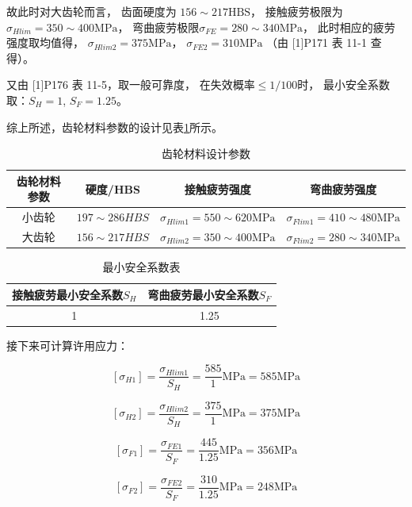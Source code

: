 \documentclass[12pt]{ctexart}
\begin{document}
故此时对大齿轮而言，
齿面硬度为 $156\sim 217\text{HBS}$，
接触疲劳极限为$\sigma_{Hlim}=350\sim 400\text{MPa}$，
弯曲疲劳极限$\sigma_{FE}=280\sim 340\text{MPa}$，
此时相应的疲劳强度取均值得，
$\sigma_{Hlim2} = 375\text{MPa}$，
$\sigma_{FE2}= 310\text{MPa}$
（由 [1]P171 表 11-1 查得）。

又由 [1]P176 表 11-5，取一般可靠度，
在失效概率$\le 1/100$时，
最小安全系数取：$S_H=1$, $S_F=1.25$。

综上所述，齿轮材料参数的设计见表\ref{label_1}所示。

\begin{table}[htbp]
    \centering
    \setlength{\belowcaptionskip}{0.3cm}
    \caption{齿轮材料设计参数}
    \begin{tabular}{c c c c}
        \toprule
        \textbf{齿轮材料参数} & \textbf{硬度/HBS} & \textbf{接触疲劳强度} & \textbf{弯曲疲劳强度} \\
        \midrule
        小齿轮 & $197\sim 286 HBS$ &  $\sigma_{Hlim1} = 550\sim 620\text{MPa}$ & $\sigma_{Flim1} = 410\sim 480\text{MPa}$ \\
        大齿轮 & $156\sim 217 HBS$ & $\sigma_{Hlim2} = 350\sim 400\text{MPa}$ & $\sigma_{Flim2} = 280\sim 340\text{MPa}$ \\
        \bottomrule
    \end{tabular}
    
    \label{label_1}
\end{table}


\begin{table}[htbp]
	\centering
    \setlength{\belowcaptionskip}{0.3cm}
	\caption{最小安全系数表}
    \begin{tabular}{cc}
		\toprule
		接触疲劳最小安全系数$S_H$ & 弯曲疲劳最小安全系数$S_F$ \\
		\midrule
		 1 & 1.25 \\
		\bottomrule
	\end{tabular}

\end{table}


接下来可计算许用应力：

$$[\sigma_{H1}]=\frac{\sigma_{Hlim1}}{S_H}=\frac{585}{1}\text{MPa}=585\text{MPa}$$

$$[\sigma_{H2}]=\frac{\sigma_{Hlim2}}{S_H}=\frac{375}{1}\text{MPa}=375\text{MPa}$$

$$[\sigma_{F1}]=\frac{\sigma_{FE1}}{S_F}=\frac{445}{1.25}\text{MPa}=356\text{MPa}$$

$$[\sigma_{F2}]=\frac{\sigma_{FE2}}{S_F}=\frac{310}{1.25}\text{MPa}=248\text{MPa}$$
\end{document}
